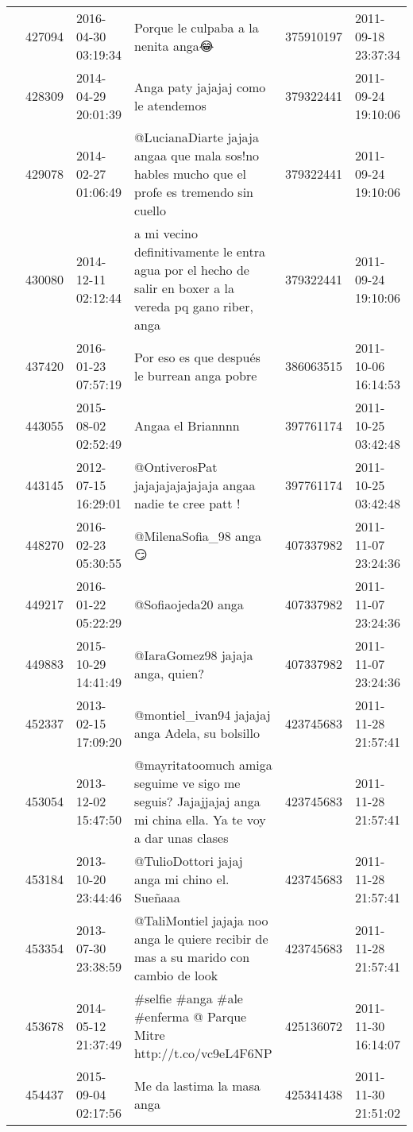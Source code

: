 \begin{tabular}{llllrl}
 & 427094& 2016-04-30 03:19:34 &Porque le culpaba a la nenita anga😂 & 375910197 & 2011-09-18 23:37:34 \\
 & 428309& 2014-04-29 20:01:39 &Anga paty jajajaj como le atendemos & 379322441 & 2011-09-24 19:10:06 \\
 & 429078& 2014-02-27 01:06:49 & @LucianaDiarte jajaja angaa que mala sos!no hables mucho que el profe es tremendo sin cuello & 379322441 & 2011-09-24 19:10:06 \\
 & 430080& 2014-12-11 02:12:44 & a mi vecino definitivamente le entra agua por el hecho de salir en boxer a la vereda pq gano riber, anga & 379322441 & 2011-09-24 19:10:06 \\
 & 437420& 2016-01-23 07:57:19 & Por eso es que después le burrean anga pobre & 386063515 & 2011-10-06 16:14:53 \\
 & 443055& 2015-08-02 02:52:49 &Angaa el Briannnn & 397761174 & 2011-10-25 03:42:48 \\
 & 443145& 2012-07-15 16:29:01 &@OntiverosPat jajajajajajajaja angaa nadie te cree patt ! & 397761174 & 2011-10-25 03:42:48 \\
 & 448270& 2016-02-23 05:30:55 & @MilenaSofia\_98 anga 😏 & 407337982 & 2011-11-07 23:24:36 \\
 & 449217& 2016-01-22 05:22:29 & @Sofiaojeda20 anga & 407337982 & 2011-11-07 23:24:36 \\
 & 449883& 2015-10-29 14:41:49 & @IaraGomez98 jajaja anga, quien? & 407337982 & 2011-11-07 23:24:36 \\
 & 452337& 2013-02-15 17:09:20 &@montiel\_ivan94 jajajaj anga Adela, su bolsillo & 423745683 & 2011-11-28 21:57:41 \\
 & 453054& 2013-12-02 15:47:50 &@mayritatoomuch amiga seguime ve sigo me seguis? Jajajjajaj anga mi china ella. Ya te voy a dar unas clases & 423745683 & 2011-11-28 21:57:41 \\
 & 453184& 2013-10-20 23:44:46 &@TulioDottori jajaj anga mi chino el. Sueñaaa & 423745683 & 2011-11-28 21:57:41 \\
 & 453354& 2013-07-30 23:38:59 & @TaliMontiel jajaja noo anga le quiere recibir de mas a su marido con cambio de look & 423745683 & 2011-11-28 21:57:41 \\
 & 453678& 2014-05-12 21:37:49 &\#selfie \#anga \#ale \#enferma @ Parque Mitre http://t.co/vc9eL4F6NP & 425136072 & 2011-11-30 16:14:07 \\
 & 454437& 2015-09-04 02:17:56 & Me da lastima la masa anga & 425341438 & 2011-11-30 21:51:02 \\

\end{tabular}
